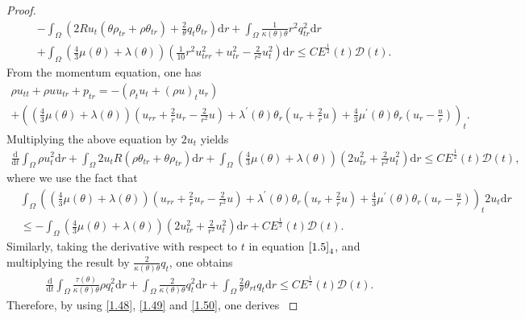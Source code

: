 \documentclass[10pt,a4paper]{amsart}
\newcommand{\dif}{\mathrm{d}}
\begin{document}
\begin{proof}
\begin{align}
  & -\int_{\Omega}  \left(2R u_t (\theta \rho_{tr}+\rho \theta_{tr})+\frac{2}{\theta} q_t\theta_{tr}\right)\dif r
+\int_{\Omega} \frac{1}{\kappa(\theta)\theta} r^2 q_{tr}^2 \dif r  \nonumber\\
&+ \int_{\Omega} \left(\frac{4}{3} \mu(\theta)+\lambda(\theta)\right)\left(\frac{1}{10} r^2 u_{trr}^2+u_{tr}^2-\frac{2}{r^2} u_t^2\right) \dif r \le CE^\frac{1}{2}(t) \mathcal D(t). \label{1.48}
 \end{align}
 From the momentum equation, one has
 \begin{align*}
 \rho u_{tt}+\rho u u_{tr}+p_{tr}=-(\rho_t u_t+(\rho u)_t u_r) \qquad\qquad\qquad\qquad\qquad\\
+ \left(\left(\frac{4}{3} \mu(\theta)+\lambda(\theta)\right)\left(u_{rr}+\frac{2}{r}u_r-\frac{2}{r^2} u\right)+\lambda^\prime(\theta)\theta_r\left(u_r+\frac{2}{r}u\right)+\frac{4}{3}\mu^\prime(\theta) \theta_r\left(u_r-\frac{u}{r}\right)\right)_t.
 \end{align*}
 Multiplying the above equation by $2 u_t$ yields{\small
 \begin{align}\label{1.49}
 \frac{\dif}{\dif t} \int_{\Omega} \rho u_t^2\dif r+\int_{\Omega} 2 u_t R(\rho \theta_{tr}+\theta \rho_{tr})\dif r
 +\int_{\Omega} \left(\frac{4}{3} \mu(\theta)+\lambda(\theta)\right)\left(2u_{tr}^2+\frac{2}{r^2} u_t^2 \right)\dif r \le CE^\frac{1}{2}(t) \mathcal D(t),
 \end{align}}
 where we use the fact that{\small
\begin{align*}
&\int_{\Omega} \left(\left(\frac{4}{3} \mu(\theta)+\lambda(\theta)\right)\left(u_{rr}+\frac{2}{r}u_r-\frac{2}{r^2} u\right)+\lambda^\prime(\theta)\theta_r\left(u_r+\frac{2}{r}u\right)+\frac{4}{3}\mu^\prime(\theta) \theta_r\left(u_r-\frac{u}{r}\right) \right)_t2 u_t \dif r\\
&\le -\int_{\Omega} \left(\frac{4}{3} \mu(\theta)+\lambda(\theta)\right)\left(2u_{tr}^2+\frac{2}{r^2} u_t^2 \right)\dif r+CE^\frac{1}{2}(t) \mathcal D(t).
\end{align*}}
 Similarly, taking the derivative with respect to $t$ in equation $\eqref{1.5}_4$, and multiplying the result by $\frac{2}{\kappa(\theta)\theta} q_t$, one obtains
 \begin{align}\label{1.50}
 \frac{\dif}{\dif t} \int_{\Omega} \frac{\tau(\theta)}{\kappa(\theta)\theta} \rho q_t^2 \dif r+\int_{\Omega} \frac{2}{\kappa(\theta)\theta} q_t^2\dif r+\int_{\Omega} \frac{2}{\theta} \theta_{rt}q_t \dif r \le CE^\frac{1}{2}(t) \mathcal D(t).
 \end{align}
 Therefore, by using \eqref{1.48}, \eqref{1.49} and \eqref{1.50}, one derives{\small
}
\end{proof}
\end{document}
